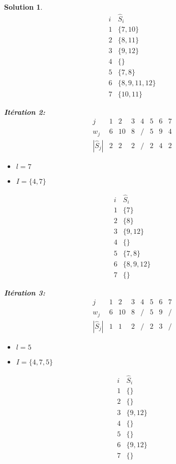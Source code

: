 \documentclass[a4paper,11pt]{report}
\newtheorem{solution}{Solution}
\begin{document}
\begin{solution}
$$
\begin{array}{c|c}
i & \widehat{S}_i\\
\hline
1 & \{7,10\} \\
2 & \{8,11\} \\
3 & \{9,12\} \\
4 & \{\} \\
5 & \{7,8\} \\
6 & \{8,9,11,12\} \\
7 & \{10,11\}
\end{array}
$$

\noindent\textbf{Itération 2:}
$$
\begin{array}{c|ccccccc}
j               & 1 & 2  & 3 & 4 & 5 & 6 & 7\\
\hline
w_j             & 6 & 10 & 8 & / & 5 & 9 & 4\\
|\widehat{S}_j| & 2 & 2  & 2 & / & 2 & 4 & 2
\end{array}
$$

\begin{itemize}
\item $l = 7$
\item $I = \{4, 7\}$
\end{itemize}

$$
\begin{array}{c|c}
i & \widehat{S}_i\\
\hline
1 & \{7\} \\
2 & \{8\} \\
3 & \{9,12\} \\
4 & \{\} \\
5 & \{7,8\} \\
6 & \{8,9,12\} \\
7 & \{\}
\end{array}
$$

\noindent\textbf{Itération 3:}
$$
\begin{array}{c|ccccccc}
j               & 1 & 2  & 3 & 4 & 5 & 6 & 7\\
\hline
w_j             & 6 & 10 & 8 & / & 5 & 9 & /\\
|\widehat{S}_j| & 1 & 1  & 2 & / & 2 & 3 & /
\end{array}
$$

\begin{itemize}
\item $l = 5$
\item $I = \{4, 7, 5\}$
\end{itemize}

$$
\begin{array}{c|c}
i & \widehat{S}_i\\
\hline
1 & \{\} \\
2 & \{\} \\
3 & \{9,12\} \\
4 & \{\} \\
5 & \{\} \\
6 & \{9,12\} \\
7 & \{\}
\end{array}
$$


\end{solution}
\end{document}
